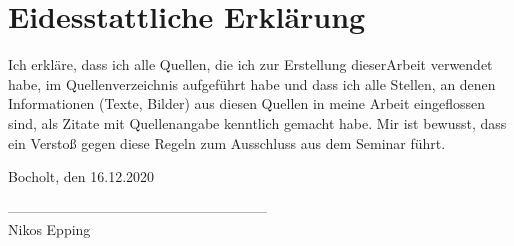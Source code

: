 \documentclass[12pt,ngerman,a4paper,parskip]{scrartcl}
\begin{document}



\newpage

\tableofcontents

\newpage















\appendix

\newpage

\newpage

\listoffigures
\listoftables



\newpage
\section*{Eidesstattliche Erklärung}
Ich erkläre, dass ich alle Quellen, die ich zur Erstellung dieserArbeit verwendet habe, im Quellenverzeichnis aufgeführt habe und dass ich alle Stellen, an denen Informationen (Texte, Bilder) aus diesen Quellen in meine Arbeit eingeflossen sind, als Zitate mit Quellenangabe kenntlich gemacht habe.
Mir ist bewusst, dass ein Verstoß gegen diese Regeln zum Ausschluss aus dem Seminar führt.

\vspace{1.5cm}

\small
Bocholt, den 16.12.2020

\vspace{0.8cm}

--------------------------------------------------------\\
Nikos Epping
\end{document}
